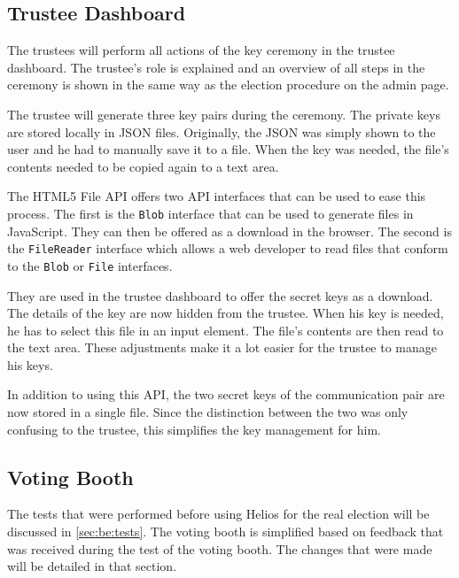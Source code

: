 \subsection{Trustee Dashboard}

The trustees will perform all actions of the key ceremony in the trustee dashboard. The trustee's role is explained and an overview of all steps in the ceremony is shown in the same way as the election procedure on the admin page.

\par The trustee will generate three key pairs during the ceremony. The private keys are stored locally in JSON files. Originally, the JSON was simply shown to the user and he had to manually save it to a file. When the key was needed, the file's contents needed to be copied again to a text area.

\par The HTML5 File API offers two API interfaces that can be used to ease this process.\cite{ranganathan_sicking_file_api} The first is the \texttt{Blob} interface that can be used to generate files in JavaScript. They can then be offered as a download in the browser. The second is the \texttt{FileReader} interface which allows a web developer to read files that conform to the \texttt{Blob} or \texttt{File} interfaces.

\par They are used in the trustee dashboard to offer the secret keys as a download. The details of the key are now hidden from the trustee. When his key is needed, he has to select this file in an input element. The file's contents are then read to the text area. These adjustments make it a lot easier for the trustee to manage his keys.

\par In addition to using this API, the two secret keys of the communication pair are now stored in a single file. Since the distinction between the two was only confusing to the trustee, this simplifies the key management for him.

\subsection{Voting Booth}

The tests that were performed before using Helios for the real election will be discussed in \ref{sec:be:tests}. The voting booth is simplified based on feedback that was received during the test of the voting booth. The changes that were made will be detailed in that section.
